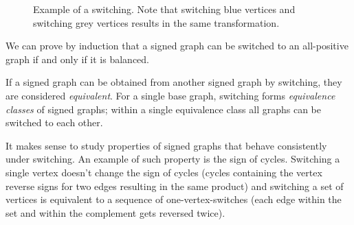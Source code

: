 \begin{figure}[h]
    \caption[Example of a switching]{Example of a switching. Note that switching blue vertices and switching grey vertices results in the same transformation.}
\end{figure}

We can prove by induction that a signed graph can be switched to an all-positive graph if and only if it is balanced.

\begin{definition}
    If a signed graph can be obtained from another signed graph by switching, they are considered \textit{equivalent}. For a single base graph, switching forms \textit{equivalence classes} of signed graphs; within a single equivalence class all graphs can be switched to each other.
\end{definition}

It makes sense to study properties of signed graphs that behave consistently under switching. An example of such property is the sign of cycles. Switching a single vertex doesn't change the sign of cycles (cycles containing the vertex reverse signs for two edges resulting in the same product) and switching a set of vertices is equivalent to a sequence of one-vertex-switches (each edge within the set and within the complement gets reversed twice).

